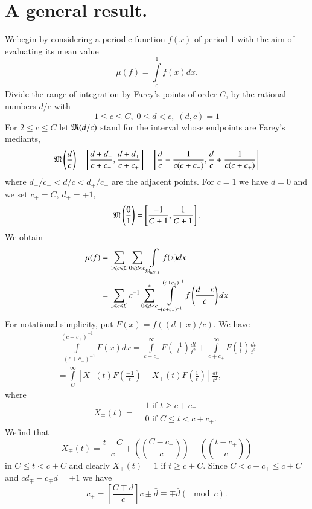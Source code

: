 \section{A general result.}\label{art6-sec2}
We\pageoriginale begin by considering a periodic function $f(x)$ of period 1 with the aim of evaluating its mean value
$$
\mu (f) = \int\limits^1_0 f (x) dx.
$$
Divide the range of integration by Farey's points of order $C$, \ie by the rational numbers $d/c$ with 
$$
1 \leqslant c \leqslant C, \; 0 \leqslant d < c, \; (d, c) = 1
$$
For $2 \leqslant c \leqslant C$ let $\mathfrak{M} (d/c)$ stand for the interval whose endpoints are Farey's mediants, \ie
$$
\mathfrak{M} \left(\frac{d}{c} \right) = \left[\frac{d+d_-}{c+c_-}, \frac{d+d_+}{c+c_+} \right] = \left[\frac{d}{c} - \frac{1}{c(c+c_-)}, \frac{d}{c} + \frac{1}{c(c+c_+)} \right]
$$
where $d_- /c_- < d/c < d_+/c_+$ are the adjacent points. For $c =1$ we have $d=0$ and we set $c_\mp = C$, $d_\mp = \mp 1$,
$$
\mathfrak{M} \left(\frac{0}{1} \right) = \left[\frac{-1}{C+1} , \frac{1}{C+1} \right].
$$
We obtain 
\begin{align*}
\mu(f) & = \sum\limits_{1 \leqslant c \leqslant C} \sum\limits_{0\leqslant d < c} \int\limits_{\mathfrak{M}_{(d/c)}} f(x)  dx\\
& = \sum\limits_{1\leqslant c \leqslant C} c^{-1} \sum\limits^\ast_{0 \leqslant d < c} \int\limits^{(c+c_+)^{-1}}_{-(c+c_-)^{-1}} f \left(\frac{d+x}{c} \right) dx
\end{align*}
For notational simplicity, put $F(x) = f((d+x)/c)$. We have
\begin{gather*}
\int\limits^{(c+c_+)^{-1}}_{-(c+c_-)^{-1}} F(x) dx = \int\limits^\infty_{c+c_-} F \left(\frac{-1}{t} \right) \frac{dt}{t^2} + \int\limits^\infty_{c+c_+} F \left(\frac{1}{t} \right) \frac{dt}{t^2}\\
= \int\limits^\infty_C \left[X_-(t) F \left(\frac{-1}{t} \right) + X_+ (t) F \left(\frac{1}{t} \right) \right] \frac{dt}{t^2},
\end{gather*}
where 
$$
X_\mp (t) = 
\begin{aligned}
& 1 \text{ if } t \geqslant c + c_{\mp}\\
& 0 \text{ if } C \leqslant t < c + c_{\mp} .
\end{aligned}
$$
We\pageoriginale find that
$$
X_{\mp} (t) = \frac{t - C}{c} + \left(\left(\frac{C-c_{\mp}}{c} \right) \right) - \left(\left(\frac{t-c_{\mp}}{c} \right) \right)
$$
in $C\leqslant t < c+ C$ and clearly $X_{\mp}(t) =1$ if $t \geqslant c+ C$. Since $C < c+ c_{\mp} \leqslant c+ C$ and $cd_{\mp} - c_{\mp} d = \mp 1$ we have
$$
c_{\mp} = \left[\frac{C\mp d}{c} \right] c \pm \bar{d} \equiv \mp \bar{d} (\mod c).
$$
